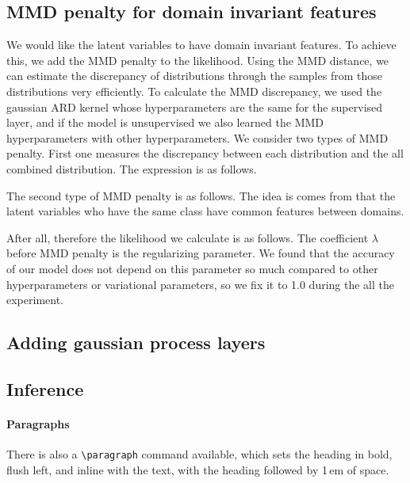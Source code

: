 \documentclass{article}
\begin{document}
\subsection{MMD penalty for domain invariant features}
We would like the latent variables to have domain invariant features. To achieve this, we add the MMD penalty to the likelihood. Using the MMD distance, we can estimate the discrepancy of distributions through the samples from those distributions very efficiently. To calculate the MMD discrepancy, we used the gaussian ARD kernel whose hyperparameters are the same for the supervised layer, and if the model is unsupervised we also learned the MMD hyperparameters with other hyperparameters.
We consider two types of MMD penalty. First one measures the discrepancy between each distribution and the all combined distribution. The expression is as follows.

The second type of MMD penalty is as follows. The idea is comes from that the latent variables who have the same class have common features between domains.

After all, therefore the likelihood we calculate is as follows. The coefficient $\lambda$ before MMD penalty is the regularizing parameter. We found that the accuracy of our model does not depend on this parameter so much compared to other hyperparameters or  variational parameters, so we fix it to 1.0 during the all the experiment.

\subsection{Adding gaussian process layers}


\subsection{Inference}

\paragraph{Paragraphs}

There is also a \verb+\paragraph+ command available, which sets the
heading in bold, flush left, and inline with the text, with the
heading followed by 1\,em of space.
\end{document}
